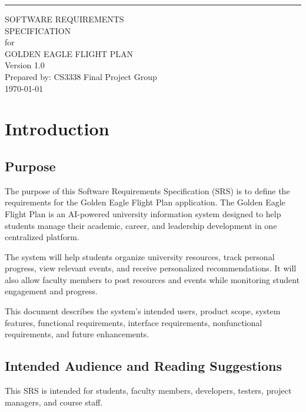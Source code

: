 \documentclass{scrreprt}
\date{}
\def\myversion{1.0}
\begin{document}
\begin{flushright}
    \rule{16cm}{5pt}\vskip1cm
    \begin{bfseries}
        \Huge{SOFTWARE REQUIREMENTS\\ SPECIFICATION}\\
        \vspace{1.5cm}
        for\\
        \vspace{1.5cm}
        GOLDEN EAGLE FLIGHT PLAN\\
        \vspace{1.5cm}
        \LARGE{Version \myversion}\\
        \vspace{1.5cm}
        Prepared by: CS3338 Final Project Group\\

        \vspace{1.5cm}
        \today\\
    \end{bfseries}
\end{flushright}

\tableofcontents

\chapter{Introduction}

\section{Purpose}
The purpose of this Software Requirements Specification (SRS) is to define the requirements for the Golden Eagle Flight Plan application. The Golden Eagle Flight Plan is an AI-powered university information system designed to help students manage their academic, career, and leadership development in one centralized platform.

The system will help students organize university resources, track personal progress, view relevant events, and receive personalized recommendations. It will also allow faculty members to post resources and events while monitoring student engagement and progress.

This document describes the system's intended users, product scope, system features, functional requirements, interface requirements, nonfunctional requirements, and future enhancements.

\section{Intended Audience and Reading Suggestions}
This SRS is intended for students, faculty members, developers, testers, project managers, and course staff.
\end{document}
